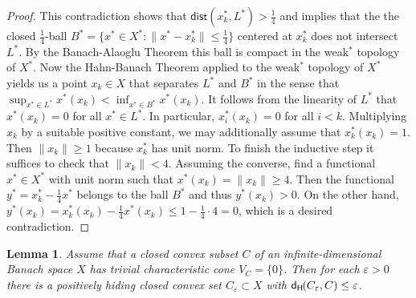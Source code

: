 \documentclass{amsart}
\newcommand{\e}{\varepsilon}
\newcommand{\dist}{\mathsf{dist}}
\newcommand{\dH}{\mathsf{d}_{\mathsf H}\kern-1pt}
\newtheorem{lemma}[theorem]{Lemma}
\theoremstyle{definition}
\begin{document}
\begin{proof}
This contradiction shows that $\dist(x^*_k,L^*)>\frac14$ and implies that the the closed $\frac14$-ball $B^*=\{x^*\in X^*:\|x^*-x^*_{k}\|\le \frac14\}$ centered at $x^*_{k}$ does not intersect $L^*$. By the Banach-Alaoglu Theorem this ball is compact in the weak$^*$ topology of $X^*$. Now the Hahn-Banach Theorem applied to the weak$^*$ topology of $X^*$ yields us a point $x_{k}\in X$ that separates $L^*$ and $B^*$ in the sense that $\sup_{x^*\in L^*}x^*(x_{k})< \inf_{x^*\in B^*}x^*(x_{k})$.
It follows from the linearity of $L^*$ that $x^*(x_{k})=0$ for all $x^*\in L^*$.
In particular, $x^*_i(x_{k})=0$ for all $i< k$. Multiplying $x_{k}$ by a suitable positive constant, we may additionally assume that $x^*_{k}(x_{k})=1$.
Then $\|x_{k}\|\ge 1$ because $x^*_{k}$ has unit norm. To finish the inductive step it suffices to check that $\|x_k\|<4$. Assuming the converse, find a functional $x^*\in X^*$ with unit norm such that $x^*(x_k)=\|x_k\|\ge 4$. Then the functional $y^*=x^*_k-\frac14x^*$ belongs to the ball $B^*$ and thus $y^*(x_k)>0$. On the other hand, $y^*(x_k)=x^*_k(x_k)-\frac14x^*(x_k)\le 1-\frac14\cdot4= 0$, which is a desired contradiction.
\end{proof}

\begin{lemma}\label{l6.2}  Assume that a closed convex subset $C$ of an infinite-dimensional Banach space $X$ has trivial characteristic cone $V_C=\{0\}$. Then for each $\e>0$ there is a positively hiding closed convex set $C_\e\subset X$ with $\dH(C_\e,C)\le \e$.
\end{lemma}
\end{document}
